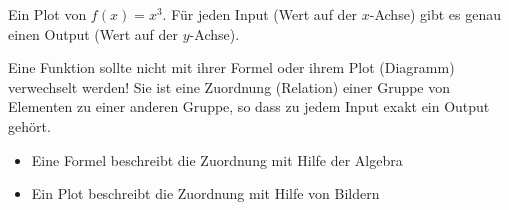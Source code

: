 \begin{marginfigure}[0in]
\caption{Ein Plot von $f(x)=x^3$. Für jeden Input (Wert auf der $x$-Achse) gibt es genau einen Output (Wert auf der $y$-Achse).}
\label{plot:fxn x^3}
\end{marginfigure}

\begin{warning}
Eine Funktion sollte nicht mit ihrer Formel oder ihrem Plot (Diagramm) verwechselt werden! Sie ist eine Zuordnung (Relation) einer Gruppe von Elementen zu einer anderen Gruppe, so dass zu jedem Input exakt ein Output gehört.
\begin{itemize}
\item Eine Formel beschreibt die Zuordnung mit Hilfe der Algebra

\item  Ein Plot beschreibt die Zuordnung mit Hilfe von Bildern

\end{itemize}
\end{warning}



